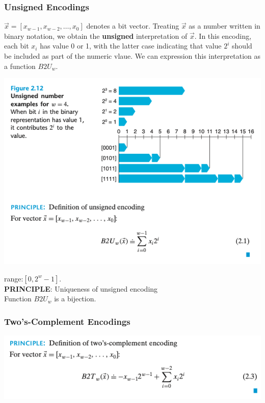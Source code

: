 \documentclass[11pt]{article}
\begin{document}
\subsubsection{Unsigned Encodings}
\label{sec:org2d34e75}
\(\vec{x} = [x_{w-1},x_{w-2},\dots,x_0]\) denotes a bit vector. Treating \(\vec{x}\) as a number written in binary notation, we obtain the \textbf{unsigned} interpretation of \(\vec{x}\). In this encoding, each bit \(x_i\) has value 0 or 1, with the latter case indicating that value \(2^i\) should be included as part of the numeric vlaue. We can expression this interpretation as a function \(B2U_w\).\\

\begin{center}
\includegraphics[width=.9\linewidth]{pics/unsigned-encoding.png}
\end{center}

range:\([0,2^w-1]\).\\

\textbf{PRINCIPLE}: Uniqueness of unsigned encoding\\
Function \(B2U_w\) is a bijection.\\


\subsubsection{Two's-Complement Encodings}
\label{sec:org0151a5e}

\begin{center}
\includegraphics[width=.9\linewidth]{pics/two's-complement-encoding.png}
\end{center}
\end{document}
